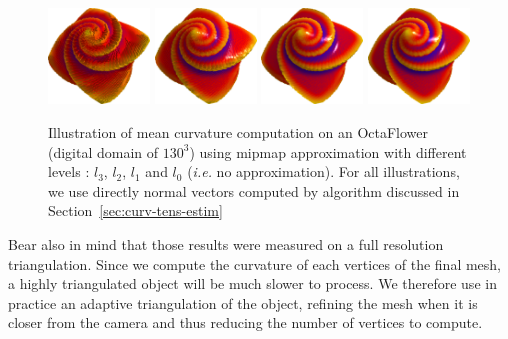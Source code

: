 \documentclass{llncs}
\newcommand{\ie}{\emph{i.e.} }
\begin{document}
\begin{figure}[!htbp]
  \vspace{-0.35cm}
  \begin{center}
   {\includegraphics[width=2.7cm]{figs/octa_r10_l3_a}}
   {\includegraphics[width=2.7cm]{figs/octa_r10_l2_a}}
   {\includegraphics[width=2.7cm]{figs/octa_r10_l1_a}}
   {\includegraphics[width=2.7cm]{figs/octa_r10_l0_a}}
  \end{center}
  \vspace{-0.35cm}
  \caption{Illustration of mean curvature computation on an OctaFlower (digital domain of $130^3$) using mipmap approximation with different levels : $l_3$, $l_2$, $l_1$ and $l_0$ (\ie no approximation).
  For all illustrations, we use directly normal vectors computed by algorithm discussed in Section~\ref{sec:curv-tens-estim}}
  \label{fig:refine}
  \vspace{-0.35cm}
\end{figure}

Bear also in mind that those results were measured on a full resolution
triangulation. Since we compute the curvature of each vertices of the final
mesh, a highly triangulated object will be much slower to process. We therefore
use in practice an adaptive triangulation of the object, refining the mesh when
it is closer from the camera and thus reducing the number of vertices to
compute.
\end{document}
